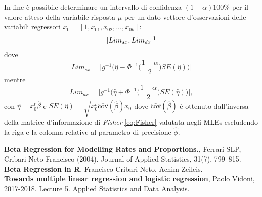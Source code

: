 \documentclass[twoside,twocolumn]{article}
\begin{document}
In fine è possibile determinare un intervallo di confidenza $(1-\alpha)100\%$ per il valore atteso della variabile risposta $\mu$ per un dato vettore d'osservazioni delle variabili regressori $x_0=[1,x_{01},x_{02},...,x_{0k}]$:
$$[Lim_{sx}, Lim_{dx}]\footnote{Tale intervallo è valido solo per funzioni di collegamento $g(\cdot)$ strettamente crescenti.}$$ dove 
$$Lim_{sx}=\bigg[ g^{-1}\bigg(\hat{\eta} -\Phi^{-1}\Big(\frac{1-\alpha}{2}\Big)SE(\hat{\eta})\bigg)  \bigg]  $$
mentre
$$ Lim_{dx}=\bigg[ g^{-1}\bigg(\hat{\eta} +\Phi^{-1}\Big(\frac{1-\alpha}{2}\Big)SE(\hat{\eta})\bigg)  \bigg], $$
con $\hat{\eta}=x_0^t \hat{\beta}$ e $SE(\hat{\eta})=\sqrt{x_0^t \widehat{\text{cov}}(\hat{\beta})x_0}$ dove $\widehat{\text{cov}}(\hat{\beta})$ è ottenuto dall'inversa della matrice d'informazione di \emph{Fisher} \eqref{eq:Fisher} valutata negli MLEs escludendo la riga e la colonna relative al parametro di precisione $\hat{\phi}$.
\newpage
\tableofcontents
		\begin{thebibliography}{99} 
	 \textbf{Beta Regression for Modelling Rates and Proportions.}, Ferrari SLP, Cribari-Neto Francisco (2004).  Journal of Applied Statistics, 31(7), 799–815.
	 \textbf{Beta Regression in R}, Francisco Cribari-Neto, Achim Zeileis.\\
	 \textbf{Towards multiple linear regression and logistic regression}, Paolo Vidoni, 2017-2018. Lecture 5. Applied Statistics and Data Analysis.
	\end{thebibliography}
\end{document}
